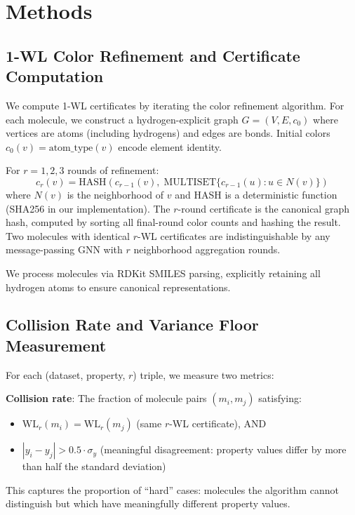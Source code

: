 \documentclass[11pt,letterpaper]{article}
\begin{document}
\section{Methods}

\subsection{1-WL Color Refinement and Certificate Computation}

We compute 1-WL certificates by iterating the color refinement algorithm. For each molecule, we construct a hydrogen-explicit graph $G = (V, E, c_0)$ where vertices are atoms (including hydrogens) and edges are bonds. Initial colors $c_0(v) = \text{atom\_type}(v)$ encode element identity.

For $r = 1, 2, 3$ rounds of refinement:
\begin{equation}
  c_r(v) = \text{HASH}\!\left(c_{r-1}(v),\; \text{MULTISET}\{c_{r-1}(u) : u \in N(v)\}\right)
\end{equation}
where $N(v)$ is the neighborhood of $v$ and HASH is a deterministic function (SHA256 in our implementation). The $r$-round certificate is the canonical graph hash, computed by sorting all final-round color counts and hashing the result. Two molecules with identical $r$-WL certificates are indistinguishable by any message-passing GNN with $r$ neighborhood aggregation rounds.

We process molecules via RDKit SMILES parsing, explicitly retaining all hydrogen atoms to ensure canonical representations.

\subsection{Collision Rate and Variance Floor Measurement}

For each (dataset, property, $r$) triple, we measure two metrics:

\textbf{Collision rate}: The fraction of molecule pairs $(m_i, m_j)$ satisfying:
\begin{itemize}
  \item $\mathrm{WL}_r(m_i) = \mathrm{WL}_r(m_j)$ (same $r$-WL certificate), AND
  \item $|y_i - y_j| > 0.5 \cdot \sigma_y$ (meaningful disagreement: property values differ by more than half the standard deviation)
\end{itemize}
This captures the proportion of ``hard'' cases: molecules the algorithm cannot distinguish but which have meaningfully different property values.
\end{document}
